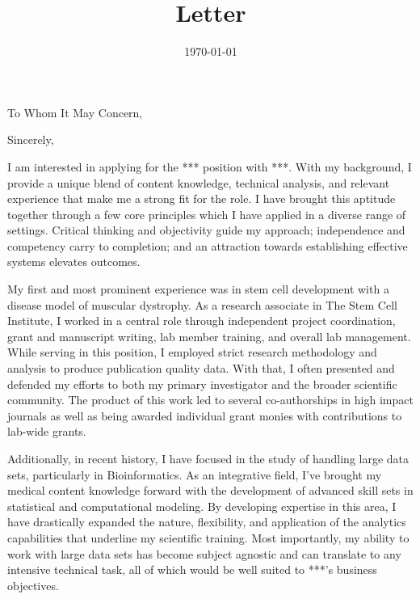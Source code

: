 \documentclass[10pt,letter,sans]{moderncv}
\newcommand{\company}{***}
\newcommand{\role}{***}
\begin{document}

\title{Letter}
\recipient{HR Department}{\company{} \\ STREET ADDRESS \\ CITY, STATE ZIP}
\date{\today}
\opening{To Whom It May Concern,}
\closing{Sincerely,}
\makelettertitle{}

I am interested in applying for the \role{} position with \company{}. With my background, I provide a unique blend of content knowledge, technical analysis, and relevant experience that make me a strong fit for the role. I have brought this aptitude together through a few core principles which I have applied in a diverse range of settings. Critical thinking and objectivity guide my approach; independence and competency carry to completion; and an attraction towards establishing effective systems elevates outcomes.

My first and most prominent experience was in stem cell development with a disease model of muscular dystrophy. As a research associate in The Stem Cell Institute, I worked in a central role through independent project coordination, grant and manuscript writing, lab member training, and overall lab management. While serving in this position, I employed strict research methodology and analysis to produce publication quality data. With that, I often presented and defended my efforts to both my primary investigator and the broader scientific community. The product of this work led to several co-authorships in high impact journals as well as being awarded individual grant monies with contributions to lab-wide grants.

Additionally, in recent history, I have focused in the study of handling large data sets, particularly in Bioinformatics. As an integrative field, I've brought my medical content knowledge forward with the development of advanced skill sets in statistical and computational modeling. By developing expertise in this area, I have drastically expanded the nature, flexibility, and application of the analytics capabilities that underline my scientific training. Most importantly, my ability to work with large data sets has become subject agnostic and can translate to any intensive technical task, all of which would be well suited to \company{}'s business objectives.
\end{document}
